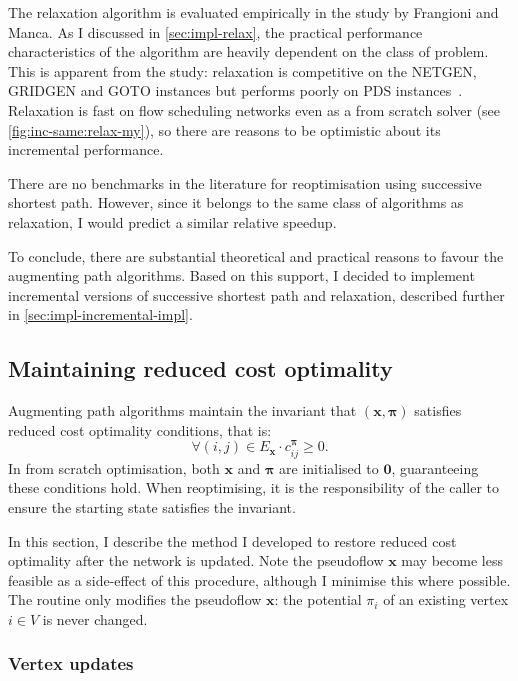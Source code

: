 The relaxation algorithm is evaluated empirically in the study by Frangioni and Manca. As I discussed in \cref{sec:impl-relax}, the practical performance characteristics of the algorithm are heavily dependent on the class of problem. This is apparent from the study: relaxation is competitive on the NETGEN, GRIDGEN and GOTO instances but performs poorly on PDS instances~\cite[tables~1~to~4]{Frangioni:2006}. Relaxation is fast on flow scheduling networks even as a from scratch solver (see \cref{fig:inc-same:relax-my}), so there are reasons to be optimistic about its incremental performance. 

There are no benchmarks in the literature for reoptimisation using successive shortest path. However, since it belongs to the same class of algorithms as relaxation, I would predict a similar relative speedup. 

To conclude, there are substantial theoretical and practical reasons to favour the augmenting path algorithms. Based on this support, I decided to implement incremental versions of successive shortest path and relaxation, described further in \cref{sec:impl-incremental-impl}.

\subsection{Maintaining reduced cost optimality} \label{sec:impl-incremental-maintaining-rc}

Augmenting path algorithms maintain the invariant that $\left(\mathbf{x},\boldsymbol{\pi}\right)$ satisfies reduced cost optimality conditions, that is:
\[\forall(i,j)\in E_{\mathbf{x}}\cdot c_{ij}^{\boldsymbol{\pi}}\geq 0.\]
In from scratch optimisation, both $\mathbf{x}$ and $\boldsymbol{\pi}$ are initialised to $\mathbf{0}$, guaranteeing these conditions hold. When reoptimising, it is the responsibility of the caller to ensure the starting state satisfies the invariant.

In this section, I describe the method I developed to restore reduced cost optimality after the network is updated. Note the pseudoflow $\mathbf{x}$ may become less feasible as a side-effect of this procedure, although I minimise this where possible. The routine only modifies the pseudoflow $\mathbf{x}$: the potential $\pi_i$ of an existing vertex $i \in V$ is never changed.

\subsubsection{Vertex updates}

